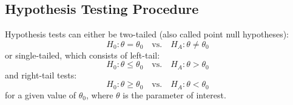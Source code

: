 \documentclass{article}
\begin{document}
\subsection{Hypothesis Testing Procedure}
Hypothesis tests can either be two-tailed (also called point null hypotheses):
\begin{equation*}
    H_0: \theta = \theta_0 \quad \text{vs.} \quad H_A: \theta \neq \theta_0
\end{equation*}
or single-tailed, which consists of left-tail:
\begin{equation*}
    H_0: \theta \leq \theta_0 \quad \text{vs.} \quad H_A: \theta > \theta_0
\end{equation*}
and right-tail tests:
\begin{equation*}
    H_0: \theta \geq \theta_0 \quad \text{vs.} \quad H_A: \theta < \theta_0
\end{equation*}
for a given value of \(\theta_0\), where \(\theta\) is the parameter of interest.
\end{document}
